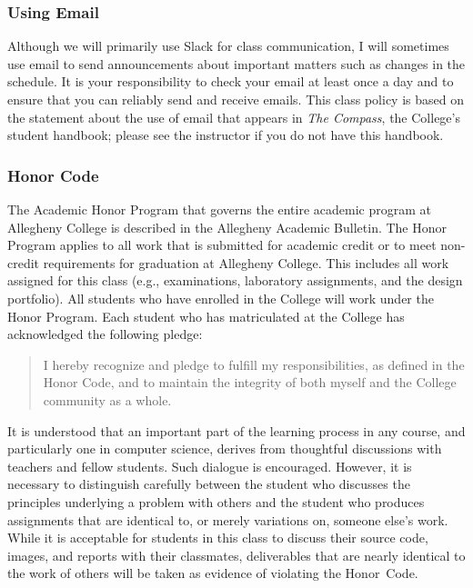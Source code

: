 \documentclass[11pt]{article}
\begin{document}
\subsubsection*{Using Email}

Although we will primarily use Slack for class communication, I will sometimes
use email to send announcements about important matters such as changes in the
schedule. It is your responsibility to check your email at least once a day and
to ensure that you can reliably send and receive emails. This class policy is
based on the statement about the use of email that appears in {\em The Compass},
the College's student handbook; please see the instructor if you do not have
this handbook.

\subsubsection*{Honor Code}

The Academic Honor Program that governs the entire academic program at Allegheny
College is described in the Allegheny Academic Bulletin. The Honor Program
applies to all work that is submitted for academic credit or to meet non-credit
requirements for graduation at Allegheny College. This includes all work
assigned for this class (e.g., examinations, laboratory assignments, and the
design portfolio). All students who have enrolled in the College will work under
the Honor Program. Each student who has matriculated at the College has
acknowledged the following pledge:

\vspace*{-.11in}
%
\begin{quote}
%
  I hereby recognize and pledge to fulfill my responsibilities, as defined in
  the Honor Code, and to maintain the integrity of both myself and the College
  community as a whole.
%
\end{quote}
%
\vspace*{-.11in}

\noindent It is understood that an important part of the learning process in any
course, and particularly one in computer science, derives from thoughtful
discussions with teachers and fellow students. Such dialogue is encouraged.
However, it is necessary to distinguish carefully between the student who
discusses the principles underlying a problem with others and the student who
produces assignments that are identical to, or merely variations on, someone
else's work. While it is acceptable for students in this class to discuss their
source code, images, and reports with their classmates, deliverables that
are nearly identical to the work of others will be taken as evidence of
violating the \mbox{Honor Code}.
\end{document}

